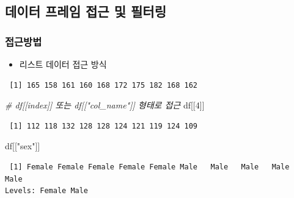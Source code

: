 \documentclass[
  11pt,
]{krantz}
\newenvironment{Shaded}{\begin{snugshade}}{\end{snugshade}}
\newcommand{\CommentTok}[1]{\textcolor[rgb]{0.37,0.37,0.37}{\textit{#1}}}
\newcommand{\DecValTok}[1]{\textcolor[rgb]{0.06,0.06,0.06}{#1}}
\newcommand{\NormalTok}[1]{#1}
\newcommand{\OperatorTok}[1]{\textcolor[rgb]{0.43,0.43,0.43}{\textbf{#1}}}
\newcommand{\StringTok}[1]{\textcolor[rgb]{0.5,0.5,0.5}{#1}}
\providecommand{\tightlist}{%
  \setlength{\itemsep}{0pt}\setlength{\parskip}{0pt}}
\begin{document}
\normalsize

\hypertarget{data-frame-get}{%
\subsection{데이터 프레임 접근 및 필터링}\label{data-frame-get}}

\hypertarget{data-frame-index}{%
\subsubsection*{접근방법}\label{data-frame-index}}


\begin{itemize}
\tightlist
\item
  리스트 데이터 접근 방식
\end{itemize}

\footnotesize

\begin{Shaded}
\end{Shaded}

\begin{verbatim}
 [1] 165 158 161 160 168 172 175 182 168 162
\end{verbatim}

\begin{Shaded}
\begin{Highlighting}[]
\CommentTok{# df[[index]] 또는 df[["col_name"]] 형태로 접근}
\NormalTok{df[[}\DecValTok{4}\NormalTok{]]}
\end{Highlighting}
\end{Shaded}

\begin{verbatim}
 [1] 112 118 132 128 128 124 121 119 124 109
\end{verbatim}

\begin{Shaded}
\begin{Highlighting}[]
\NormalTok{df[[}\StringTok{"sex"}\NormalTok{]]}
\end{Highlighting}
\end{Shaded}

\begin{verbatim}
 [1] Female Female Female Female Female Male   Male   Male   Male   Male  
Levels: Female Male
\end{verbatim}
\end{document}
